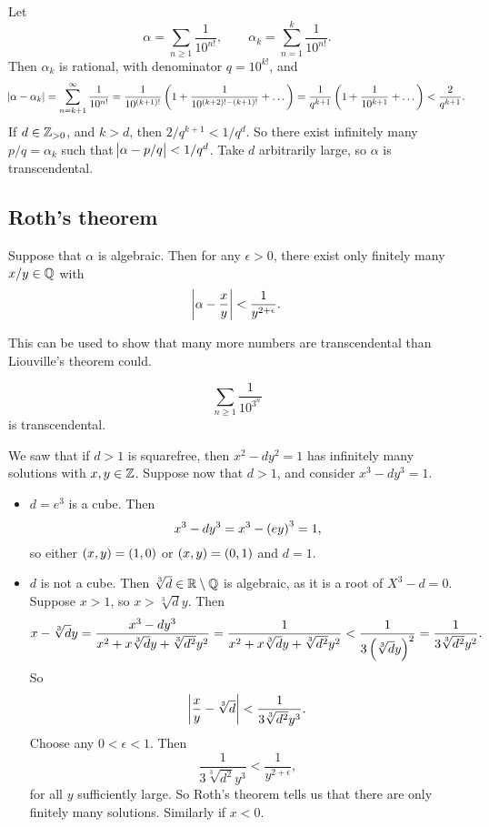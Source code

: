 \begin{example*}
Let
$$ \alpha = \sum_{n \ge 1} \dfrac{1}{10^{n!}}, \qquad \alpha_k = \sum_{n = 1}^k \dfrac{1}{10^{n!}}. $$
Then $ \alpha_k $ is rational, with denominator $ q = 10^{k!} $, and
$$ \abs{\alpha - \alpha_k} = \sum_{n = k + 1}^\infty \dfrac{1}{10^{n!}} = \dfrac{1}{10^{\br{k + 1}!}}\br{1 + \dfrac{1}{10^{\br{k + 2}! - \br{k + 1}!}} + \dots} = \dfrac{1}{q^{k + 1}}\br{1 + \dfrac{1}{10^{k + 1}} + \dots} < \dfrac{2}{q^{k + 1}}. $$
If $ d \in \mathbb{Z}_{> 0} $, and $ k > d $, then $ 2 / q^{k + 1} < 1 / q^d $. So there exist infinitely many $ p / q = \alpha_k $ such that $ \abs{\alpha - p / q} < 1 / q^d $. Take $ d $ arbitrarily large, so $ \alpha $ is transcendental.
\end{example*}

\pagebreak

\subsection{Roth's theorem}


\begin{theorem}
Suppose that $ \alpha $ is algebraic. Then for any $ \epsilon > 0 $, there exist only finitely many $ x / y \in \mathbb{Q} $ with
$$ \abs{\alpha - \dfrac{x}{y}} < \dfrac{1}{y^{2 + \epsilon}}. $$
\end{theorem}

This can be used to show that many more numbers are transcendental than Liouville's theorem could.

\begin{example*}
$$ \sum_{n \ge 1} \dfrac{1}{10^{3^n}} $$
is transcendental.
\end{example*}

\begin{example*}
We saw that if $ d > 1 $ is squarefree, then $ x^2 - dy^2 = 1 $ has infinitely many solutions with $ x, y \in \mathbb{Z} $. Suppose now that $ d > 1 $, and consider $ x^3 - dy^3 = 1 $.
\begin{itemize}
\item $ d = e^3 $ is a cube. Then
$$ x^3 - dy^3 = x^3 - \br{ey}^3 = 1, $$
so either $ \br{x, y} = \br{1, 0} $ or $ \br{x, y} = \br{0, 1} $ and $ d = 1 $.
\item $ d $ is not a cube. Then $ \sqrt[3]{d} \in \mathbb{R} \setminus \mathbb{Q} $ is algebraic, as it is a root of $ X^3 - d = 0 $. Suppose $ x > 1 $, so $ x > \sqrt[3]{d}y $. Then
$$ x - \sqrt[3]{d}y = \dfrac{x^3 - dy^3}{x^2 + x\sqrt[3]{d}y + \sqrt[3]{d^2}y^2} = \dfrac{1}{x^2 + x\sqrt[3]{d}y + \sqrt[3]{d^2}y^2} < \dfrac{1}{3\br{\sqrt[3]{d}y}^2} = \dfrac{1}{3\sqrt[3]{d^2}y^2}. $$
So
$$ \abs{\dfrac{x}{y} - \sqrt[3]{d}} < \dfrac{1}{3\sqrt[3]{d^2}y^3}. $$
Choose any $ 0 < \epsilon < 1 $. Then
$$ \dfrac{1}{3\sqrt[3]{d^2}y^3} < \dfrac{1}{y^{2 + \epsilon}}, $$
for all $ y $ sufficiently large. So Roth's theorem tells us that there are only finitely many solutions. Similarly if $ x < 0 $.
\end{itemize}
\end{example*}

